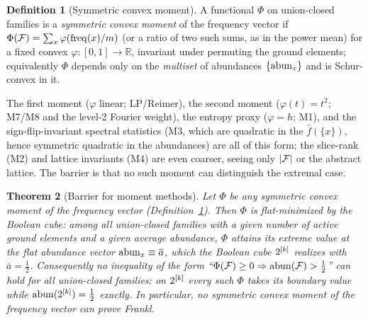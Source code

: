 \documentclass[11pt]{amsart}
\newtheorem{theorem}{Theorem}[section]
\theoremstyle{definition}
\newtheorem{definition}[theorem]{Definition}
\theoremstyle{remark}
\begin{document}
\begin{definition}[Symmetric convex moment]\label{def:scm}
A functional $\Phi$ on union-closed families is a \emph{symmetric convex moment}
of the frequency vector if $\Phi(\mathcal{F})=\sum_x\varphi(\mathrm{freq}(x)/m)$ (or a ratio of two
such sums, as in the power mean) for a fixed convex $\varphi:[0,1]\to\mathbb R$,
invariant under permuting the ground elements; equivalently $\Phi$ depends only on
the \emph{multiset} of abundances $\{\operatorname{abun}_x\}$ and is Schur-convex in it.
\end{definition}

The first moment ($\varphi$ linear; LP/Reimer), the second moment
($\varphi(t)=t^2$; M7/M8 and the level-2 Fourier weight), the entropy proxy
($\varphi=h$; M1), and the sign-flip-invariant spectral statistics (M3, which are
quadratic in the $\hat f(\{x\})$, hence symmetric quadratic in the abundances) are
all of this form; the slice-rank (M2) and lattice invariants (M4) are even coarser,
seeing only $|\mathcal{F}|$ or the abstract lattice. The barrier is that no such moment can
distinguish the extremal case.

\begin{theorem}[Barrier for moment methods]\label{thm:barrier}
Let $\Phi$ be any symmetric convex moment of the frequency vector
\textup{(Definition~\ref{def:scm})}. Then $\Phi$ is \emph{flat-minimized by the
Boolean cube}: among all union-closed families with a given number of active
ground elements and a given average abundance, $\Phi$ attains its extreme value at
the flat abundance vector $\operatorname{abun}_x\equiv\overline a$, which the Boolean cube
$2^{[k]}$ realizes with $\overline a=\tfrac12$. Consequently no inequality of the
form ``$\Phi(\mathcal{F})\ge 0\Rightarrow\operatorname{abun}(\mathcal{F})>\tfrac12$'' can hold for all
union-closed families: on $2^{[k]}$ every such $\Phi$ takes its boundary value
while $\operatorname{abun}(2^{[k]})=\tfrac12$ exactly. In particular, \emph{no symmetric convex
moment of the frequency vector can prove Frankl}.
\end{theorem}
\end{document}

